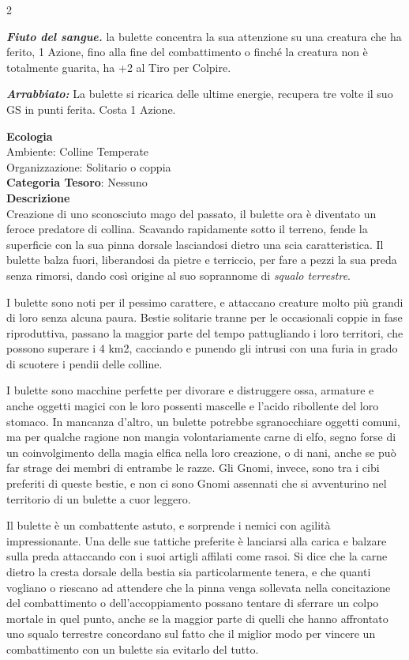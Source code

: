 \begin{multicols}{2}
{\emph{\textbf{Fiuto del sangue.}} la bulette concentra la sua attenzione su una creatura che ha ferito, 1 Azione, fino alla fine del combattimento o finché la creatura non è totalmente guarita, ha +2 al Tiro per Colpire.

\emph{\textbf{Arrabbiato:}} La bulette si ricarica delle ultime energie, recupera tre volte il suo GS in punti ferita. Costa 1 Azione.

\textbf{Ecologia}\\
Ambiente: Colline Temperate\\
Organizzazione: Solitario o coppia\\
\textbf{Categoria Tesoro}: Nessuno\\
\textbf{Descrizione}\\
Creazione di uno sconosciuto mago del passato, il bulette ora è diventato un feroce predatore di collina. Scavando rapidamente sotto il terreno, fende la superficie con la sua pinna dorsale lasciandosi dietro una scia caratteristica. Il bulette balza fuori, liberandosi da pietre e terriccio, per fare a pezzi la sua preda senza rimorsi, dando così origine al suo soprannome di \emph{squalo terrestre}.

I bulette sono noti per il pessimo carattere, e attaccano creature molto più grandi di loro senza alcuna paura. Bestie solitarie tranne per le occasionali coppie in fase riproduttiva, passano la maggior parte del tempo pattugliando i loro territori, che possono superare i 4 km2, cacciando e punendo gli intrusi con una furia in grado di scuotere i pendii delle colline.

I bulette sono macchine perfette per divorare e distruggere ossa, armature e anche oggetti magici con le loro possenti mascelle e l'acido ribollente del loro stomaco. In mancanza d'altro, un bulette potrebbe sgranocchiare oggetti comuni, ma per qualche ragione non mangia volontariamente carne di elfo, segno forse di un coinvolgimento della magia elfica nella loro creazione, o di nani, anche se può far strage dei membri di entrambe le razze. Gli Gnomi, invece, sono tra i cibi preferiti di queste bestie, e non ci sono Gnomi assennati che si avventurino nel territorio di un bulette a cuor leggero.

Il bulette è un combattente astuto, e sorprende i nemici con agilità impressionante. Una delle sue tattiche preferite è lanciarsi alla carica e balzare sulla preda attaccando con i suoi artigli affilati come rasoi. Si dice che la carne dietro la cresta dorsale della bestia sia particolarmente tenera, e che quanti vogliano o riescano ad attendere che la pinna venga sollevata nella concitazione del combattimento o dell'accoppiamento possano tentare di sferrare un colpo mortale in quel punto, anche se la maggior parte di quelli che hanno affrontato uno squalo terrestre concordano sul fatto che il miglior modo per vincere un combattimento con un bulette sia evitarlo del tutto.

}
\end{multicols}
